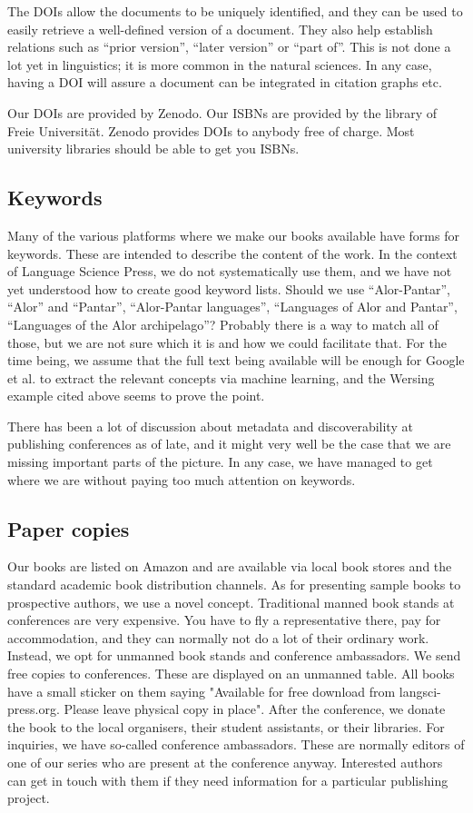 \documentclass[guidelines,nonflat,modfonts] {langsci/langscibook}
\begin{document}
The DOIs allow the documents to be uniquely identified, and they can be used to easily retrieve a well-defined version of a document. They also help establish relations such as ``prior version'', ``later version'' or ``part of''. This is not done a lot yet in linguistics; it is more common in the natural sciences. In any case, having a DOI will assure a document can be integrated in citation graphs etc. 

Our DOIs are provided by Zenodo. Our ISBNs are provided by the library of Freie Universität. Zenodo provides DOIs to anybody free of charge. Most university libraries should be able to get you ISBNs. 


\subsection{Keywords }
Many of the various platforms where we make our books available have forms for keywords. These are intended to describe the content of the work. In the context of Language Science Press, we do not systematically use them, and we have not yet understood how to create good keyword lists. Should we use ``Alor-Pantar'', ``Alor'' and ``Pantar'', ``Alor-Pantar languages'', ``Languages of Alor and Pantar'', ``Languages of the Alor archipelago''? Probably there is a way to match all of those, but we are not sure which it is and how we could facilitate that. For the time being, we assume that the full text being available will be enough for Google et al. to extract the relevant concepts via machine learning, and the Wersing example cited above seems to prove the point. 

There has been a lot of discussion about metadata and discoverability at publishing conferences as of late, and it might very well be the case that we are missing important parts of the picture. In any case, we have managed to get where we are without paying too much attention on keywords. 
                    
\subsection{Paper copies}                    
Our books are listed on Amazon and are available via local book stores and the standard academic book distribution channels. As for presenting sample books to prospective authors, we use a novel concept. Traditional manned book stands at conferences are very expensive. You have to fly a representative there, pay for accommodation, and they can normally not do a lot of their ordinary work. Instead, we opt for unmanned book stands and conference ambassadors. We send free copies to conferences.  These are displayed on an unmanned table. All books have a small sticker on them saying "Available for free download from langsci-press.org. Please leave physical copy in place". After the conference, we donate the book to the local organisers, their student assistants, or their libraries. 
For inquiries, we have so-called conference ambassadors. These are normally editors of one of our series who are present at the conference anyway. Interested authors can get in touch with them if they need information for a particular publishing project. 
                    
\end{document}
